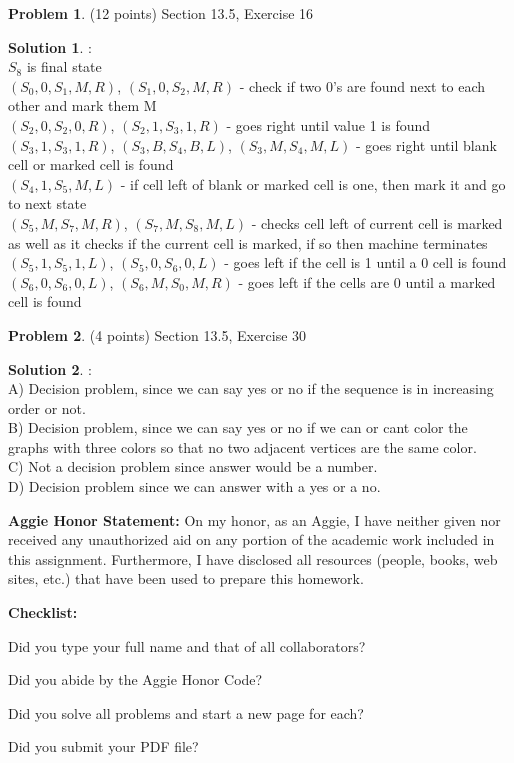 \documentclass{article}
\theoremstyle{definition}
\newtheorem{problem}{Problem}
\newtheorem*{solution}{Solution}
\newcommand{\honor}{\noindent \textbf{Aggie Honor Statement: }On my honor, as an Aggie, I have neither
  given nor received any unauthorized aid on any portion of the
  academic work included in this assignment. Furthermore, I have
  disclosed all resources (people, books, web sites, etc.) that have
  been used to prepare this homework. 
}
\newcommand{\checklist}{\noindent\textbf{Checklist:}
\begin{compactenum}
\item Did you type your full name and that of all collaborators? 
\item Did you abide by the Aggie Honor Code?
\item Did you solve all problems and start a new page for each? 
\item Did you submit your  PDF file?
\end{compactenum}
}
\begin{document}
% 
\begin{problem} (12 points)  Section 13.5, Exercise 16
\end{problem}
\begin{solution} :
\\

$S_8$ is final state \\
$(S_0, 0, S_1, M, R)$, $(S_1, 0, S_2, M, R)$ - check if two 0's are found next to each other and mark them M \\
$(S_2, 0, S_2, 0, R)$, $(S_2, 1, S_3, 1, R)$ - goes right until value 1 is found \\
$(S_3, 1, S_3, 1, R)$, $(S_3, B, S_4, B, L)$, $(S_3, M, S_4, M, L)$ - goes right until blank cell or marked cell is found \\
$(S_4, 1, S_5, M, L)$ - if cell left of blank or marked cell is one, then mark it and go to next state \\
$(S_5, M, S_7, M, R)$, $(S_7, M, S_8, M, L)$ - checks cell left of current cell is marked as well as it checks if the current cell is marked, if so then machine terminates \\
$(S_5, 1, S_5, 1, L)$, $(S_5, 0, S_6, 0, L)$ - goes left if the cell is 1 until a 0 cell is found \\
$(S_6, 0, S_6, 0, L)$, $(S_6, M, S_0, M, R)$ - goes left if the cells are 0 until a marked cell is found \\

\end{solution}

\newpage

% 
\begin{problem} (4 points) Section 13.5, Exercise 30
\end{problem}
\begin{solution} :
\\
A) Decision problem, since we can say yes or no if the sequence is in increasing order or not. \\
B) Decision problem, since we can say yes or no if we can or cant color the graphs with three colors so that no two adjacent vertices are the same color. \\
C) Not a decision problem since answer would be a number. \\
D) Decision problem since we can answer with a yes or a no.

\end{solution}

\newpage


\goodbreak
\honor

\bigskip
\checklist
\end{document}
